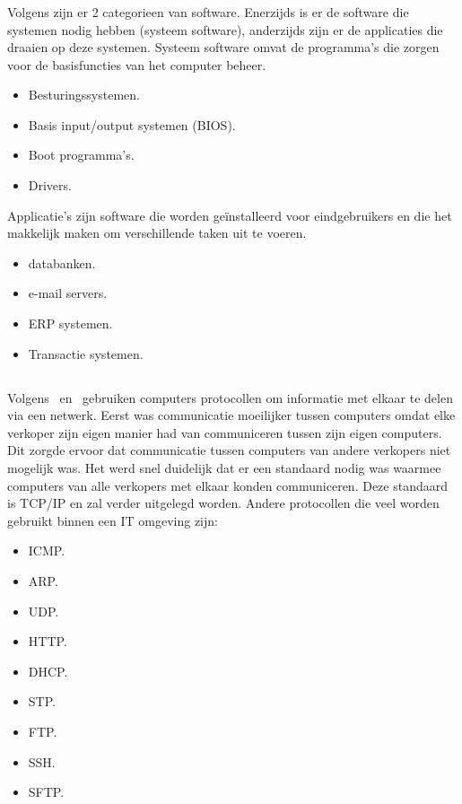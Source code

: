 \subsubsection{}
\label{subsubsec:Software}
Volgens \textcite{Castagna2021} zijn er 2 categorieen van software. Enerzijds is er de software die systemen nodig hebben (systeem software), anderzijds zijn er de applicaties die draaien op deze systemen. Systeem software omvat de programma's die zorgen voor de basisfuncties van het computer beheer.
\begin{itemize}
    \item Besturingssystemen.
    \item Basis input/output systemen (BIOS).
    \item Boot programma's.
    \item Drivers.
\end{itemize} 
Applicatie's zijn software die worden geïnstalleerd voor eindgebruikers en die het makkelijk maken om verschillende taken uit te voeren.
\begin{itemize}
    \item databanken.
    \item e-mail servers.
    \item ERP systemen.
    \item Transactie systemen.
\end{itemize}

\subsection{}
\label{subsec:IT protocollen}
Volgens~\textcite{Sharon2019} en~\textcite{Subham2021} gebruiken computers protocollen om informatie met elkaar te delen via een netwerk. Eerst was communicatie moeilijker tussen computers omdat elke verkoper zijn eigen manier had van communiceren tussen zijn eigen computers. Dit zorgde ervoor dat communicatie tussen computers van andere verkopers niet mogelijk was. Het werd snel duidelijk dat er een standaard nodig was waarmee computers van alle verkopers met elkaar konden communiceren. Deze standaard is TCP/IP en zal verder uitgelegd worden. Andere protocollen die veel worden gebruikt binnen een IT omgeving zijn:
\begin{itemize}
    \item ICMP.
    \item ARP.
    \item UDP.
    \item HTTP.
    \item DHCP.
    \item STP.
    \item FTP.
    \item SSH.
    \item SFTP.
\end{itemize}

